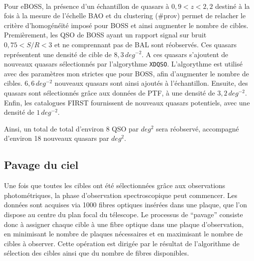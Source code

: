 \documentclass[11pt, twoside, a4paper, openright]{report}
\begin{document}
\paragraph{} Pour eBOSS, la présence d'un échantillon de quasars à $0,9 < z < 2,2$ destiné à la fois à la mesure de l'échelle BAO et du clustering (\#prov) permet de relacher le critère d'homogénéïté imposé pour BOSS et ainsi augmenter le nombre de cibles. Premièrement, les QSO de BOSS ayant un rapport signal sur bruit $0,75 < S/R < 3$ et ne comprennant pas de BAL sont réobservés. Ces quasars représentent une densité de cible de $8,3\,deg^{-2}$. A ces quasars s'ajoutent de nouveaux quasars sélectionnés par l'algorythme \texttt{XDQSO}. L'algorythme est utilisé avec des paramètres mon strictes que pour BOSS, afin d'augmenter le nombre de cibles. $6,6\,deg^{-2}$ nouveaux quasars sont ainsi ajoutés à l'échantillon. Ensuite, des quasars sont sélectionnés gr\^ace aux données de PTF, à une densité de $3,2\,deg^{-2}$. Enfin, les catalogues FIRST fournissent de nouveaux quasars potentiels, avec une densité de $1\,deg^{-2}$.

Ainsi, un total de total d'environ 8 QSO par $deg^{2}$ sera réobservé, accompagné d'environ 18 nouveaux quasars par $deg^{2}$.



\subsection{Pavage du ciel}

Une fois que toutes les cibles ont été sélectionnées grâce aux observations photométriques, la phase d'observation spectroscopique peut commencer. Les données sont acquises via \num{1000} fibres optiques insérées dans une plaque, que l'on dispose au centre du plan focal du télescope. 
Le processus de ``pavage'' consiste donc à assigner chaque cible à une fibre optique dans une plaque d'observation, en minimisant le nombre de plaques nécessaires et en maximisant le nombre de cibles à observer. Cette opération est dirigée par le résultat de l'algorithme de sélection des cibles ainsi que du nombre de fibres disponibles.
\end{document}
